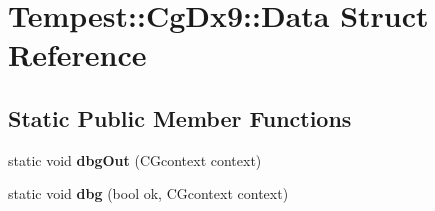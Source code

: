 \hypertarget{struct_cg_dx9_1_1_data}{\section{Tempest\+:\+:Cg\+Dx9\+:\+:Data Struct Reference}
\label{struct_cg_dx9_1_1_data}
}
\subsection*{Static Public Member Functions}
\begin{DoxyCompactItemize}
\item 
\hypertarget{struct_cg_dx9_1_1_data_ad832813d760debe3d5b0ccdc32ddc3a6}{static void {\bfseries dbg\+Out} (C\+Gcontext context)}\label{struct_cg_dx9_1_1_data_ad832813d760debe3d5b0ccdc32ddc3a6}

\item 
\hypertarget{struct_cg_dx9_1_1_data_acacc98eb2204d819bd9eb9ca57a749b4}{static void {\bfseries dbg} (bool ok, C\+Gcontext context)}\label{struct_cg_dx9_1_1_data_acacc98eb2204d819bd9eb9ca57a749b4}

\end{DoxyCompactItemize}
